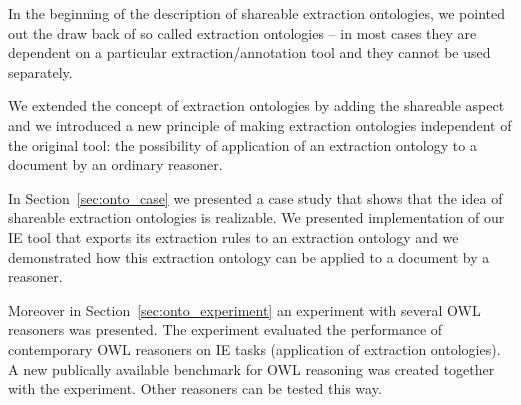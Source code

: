    
In the beginning of the description of shareable extraction ontologies, we pointed out the draw back of so called extraction ontologies -- in most cases they are dependent on a particular extraction/annotation tool and they cannot be used separately.	

We extended the concept of extraction ontologies by adding the shareable aspect and we introduced a new principle of making extraction ontologies independent of the original tool: the possibility of application of an extraction ontology to a document by an ordinary reasoner.

In Section~\ref{sec:onto_case} we presented a case study that shows that the idea of shareable extraction ontologies is realizable. We presented implementation of our IE tool that exports its extraction rules to an extraction ontology and we demonstrated how this extraction ontology can be applied to a document by a reasoner.

Moreover in Section~\ref{sec:onto_experiment} an experiment with several OWL reasoners was presented. The experiment evaluated the performance of contemporary OWL reasoners on IE tasks (application of extraction ontologies). A new publically available benchmark for OWL reasoning was created together with the experiment. Other reasoners can be tested this way.

